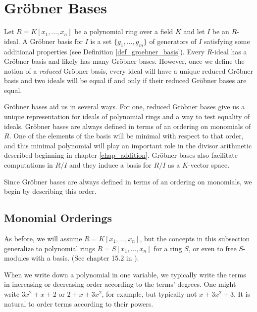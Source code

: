 

\section{Gr\"obner Bases}
\label{chap_groebner}

Let $R = K[x_1, \ldots, x_n]$ be a polynomial ring over a field $K$
and let $I$ be an $R$-ideal.
A Gr\"obner basis for $I$ is a set $\{g_1, \ldots, g_m\}$ of generators of $I$
satisfying some additional properties (see Definition \ref{def_groebner_basis}).
Every $R$-ideal has a Gr\"obner basis and likely has many Gr\"obner bases.
However, once we define the notion of a \emph{reduced} Gr\"obner basis,
every ideal will have a unique reduced Gr\"obner basis
and two ideals will be equal if and only if their reduced Gr\"obner bases are equal.

Gr\"obner bases aid us in several ways.
For one, reduced Gr\"obner bases give us a unique representation for ideals of polynomial rings
and a way to test equality of ideals.
Gr\"obner bases are always defined in terms of an ordering on monomials of $R$.
One of the elements of the basis will be minimal with respect to that order,
and this minimal polynomial will play an important role in the divisor arithmetic
described beginning in chapter \ref{chap_addition}.
Gr\"obner bases also facilitate computations in $R/I$ and they induce a basis for $R/I$ as a $K$-vector space.

Since Gr\"obner bases are always defined in terms of an ordering on monomials,
we begin by describing this order.




\subsection{Monomial Orderings}

As before, we will assume $R = K[x_1, \ldots, x_n]$,
but the concepts in this subsection generalize to polynomial rings $R = S[x_1, \ldots, x_n]$ for a ring $S$,
or even to free $S$-modules with a basis. (See chapter 15.2 in \cite{eisenbud95}).

When we write down a polynomial in one variable, we typically write the terms in increasing or decreasing order according to the terms' degrees.
One might write $3x^2 + x + 2$ or $2 + x + 3x^2$, for example, but typically not $x + 3x^2 + 3$.
It is natural to order terms according to their powers.

